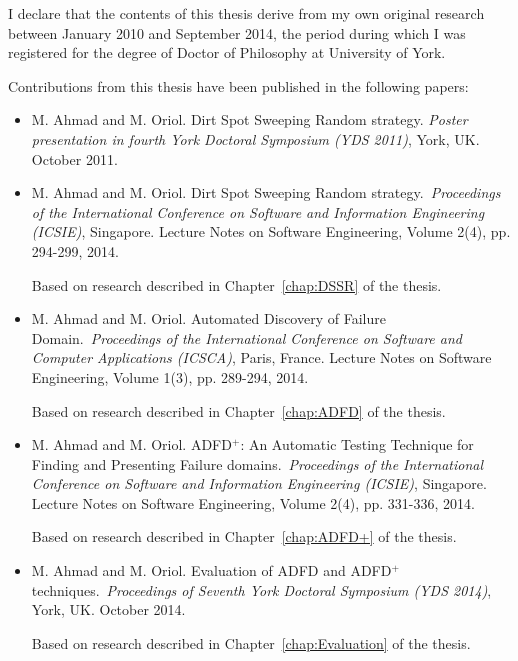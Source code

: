 \begin{declaration}

I declare that the contents of this thesis derive from my own original research between January 2010 and September 2014, the period during which I was registered for the degree of Doctor of Philosophy at University of York.

Contributions from this thesis have been published in the following papers: 

\begin{itemize}

\item M. Ahmad and M. Oriol. Dirt Spot Sweeping Random strategy. \textit{Poster presentation in fourth York Doctoral Symposium (YDS 2011)}, York, UK. October 2011.

\item M. Ahmad and M. Oriol. Dirt Spot Sweeping Random strategy.~\textit{Proceedings of the International Conference on Software and Information Engineering (ICSIE)}, Singapore. Lecture Notes on Software Engineering, Volume 2(4), pp. 294-299, 2014.

Based on research described in Chapter~\ref{chap:DSSR} of the thesis.\\

\item M. Ahmad and M. Oriol. Automated Discovery of Failure Domain.~\textit{Proceedings of the International Conference on Software and Computer Applications (ICSCA)}, Paris, France. Lecture Notes on Software Engineering, Volume 1(3), pp. 289-294, 2014.

Based on research described in Chapter~\ref{chap:ADFD} of the thesis.\\

\item M. Ahmad and M. Oriol. ADFD$^+$: An Automatic Testing Technique for Finding and Presenting Failure domains.~\textit{Proceedings of the International Conference on Software and Information Engineering (ICSIE)}, Singapore. Lecture Notes on Software Engineering, Volume 2(4), pp. 331-336, 2014.

Based on research described in Chapter~\ref{chap:ADFD+} of the thesis.\\

\item M. Ahmad and M. Oriol. Evaluation of ADFD and ADFD$^+$ techniques.~\textit{Proceedings of Seventh York Doctoral Symposium (YDS 2014)}, York, UK. October 2014. 

Based on research described in Chapter~\ref{chap:Evaluation} of the thesis.

\end{itemize}

\end{declaration}